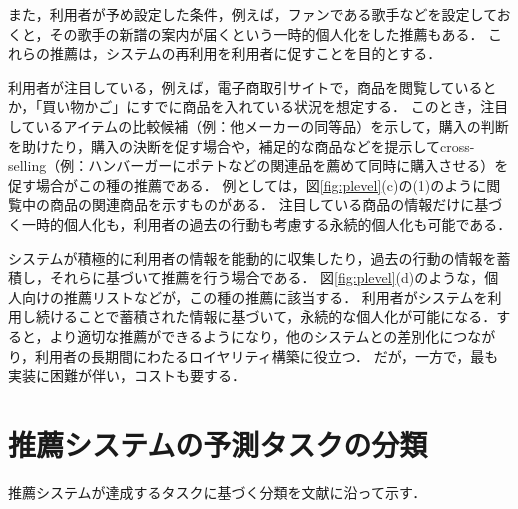 \begin{description}[style=nextline]
また，利用者が予め設定した条件，例えば，ファンである歌手などを設定しておくと，その歌手の新譜の案内が届くという一時的個人化をした推薦もある．
これらの推薦は，システムの再利用を利用者に促すことを目的とする．
\item[関連アイテム推薦 (item-associated recommendation)]
利用者が注目している，例えば，電子商取引サイトで，商品を閲覧しているとか，「買い物かご」にすでに商品を入れている状況を想定する．
このとき，注目しているアイテムの比較候補（例：他メーカーの同等品）を示して，購入の判断を助けたり，購入の決断を促す場合や，補足的な商品などを提示してcross-selling（例：ハンバーガーにポテトなどの関連品を薦めて同時に購入させる）を促す場合がこの種の推薦である．
例としては，図\ref{fig:plevel}(c)の(1)のように閲覧中の商品の関連商品を示すものがある．
注目している商品の情報だけに基づく一時的個人化も，利用者の過去の行動も考慮する永続的個人化も可能である．
\item[緊密な個人化 (deep personalization)]
システムが積極的に利用者の情報を能動的に収集したり，過去の行動の情報を蓄積し，それらに基づいて推薦を行う場合である．
図\ref{fig:plevel}(d)のような，個人向けの推薦リストなどが，この種の推薦に該当する．
利用者がシステムを利用し続けることで蓄積された情報に基づいて，永続的な個人化が可能になる．すると，より適切な推薦ができるようになり，他のシステムとの差別化につながり，利用者の長期間にわたるロイヤリティ構築に役立つ．
だが，一方で，最も実装に困難が伴い，コストも要する．
\end{description}

\section{推薦システムの予測タスクの分類}
\label{sec:recomtask}

推薦システムが達成するタスクに基づく分類を文献\cite{jacm:04:01,jmlr:09:01}に沿って示す．

